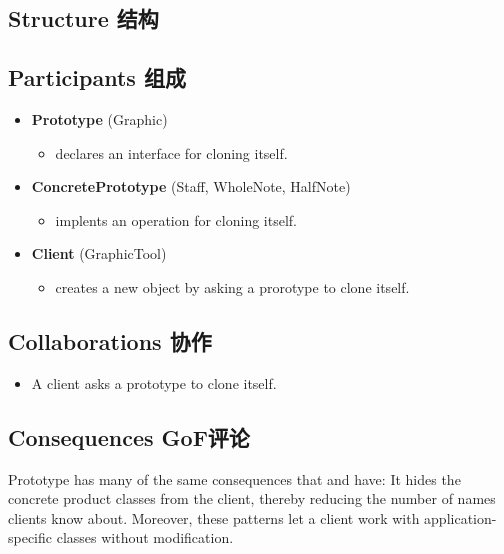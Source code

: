 \subsection{Structure 结构}


\subsection{Participants 组成}

\begin{itemize}
\small
\item \textbf{Prototype} (Graphic)

	\begin{itemize}
		\item declares an interface for cloning itself.
	\end{itemize}

\item \textbf{ConcretePrototype} (Staff, WholeNote, HalfNote)

	\begin{itemize}
		\item implents an operation for cloning itself.
	\end{itemize}

\item \textbf{Client} (GraphicTool)

	\begin{itemize}
		\item creates a new object by asking a prorotype to clone itself.
	\end{itemize}
\normalize
\end{itemize}

\subsection{Collaborations 协作}

\begin{itemize}
\item A client asks a prototype to clone itself.
\end{itemize}

\subsection{Consequences GoF评论}

Prototype has many of the same consequences that and  have: It hides the concrete product classes from the client, thereby reducing the number of names clients know about. Moreover, these patterns let a client work with application-specific classes without modification.

